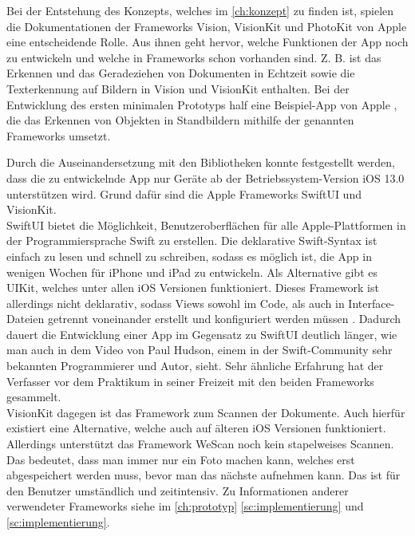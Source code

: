 \documentclass[notables, nomenclature, oneside, 150]{HSMW-Thesis}
\begin{document}
		Bei der Entstehung des Konzepts, welches im \autoref{ch:konzept} zu finden ist, spielen die Dokumentationen der Frameworks Vision, VisionKit und PhotoKit von Apple eine entscheidende Rolle. Aus ihnen geht hervor, welche Funktionen der App noch zu entwickeln und welche in Frameworks schon vorhanden sind. Z. B. ist das Erkennen und das Geradeziehen von Dokumenten in Echtzeit sowie die Texterkennung auf Bildern in Vision und VisionKit enthalten. Bei der Entwicklung des ersten minimalen Prototyps half eine Beispiel-App von Apple \cite{apple_detecting_2019}, die das Erkennen von Objekten in Standbildern mithilfe der genannten Frameworks umsetzt.
		
		Durch die Auseinandersetzung mit den Bibliotheken konnte festgestellt werden, dass die zu entwickelnde App nur Geräte ab der Betriebssystem-Version iOS 13.0 unterstützen wird. Grund dafür sind die Apple Frameworks SwiftUI und VisionKit. \\
		SwiftUI bietet die Möglichkeit, Benutzeroberflächen für alle Apple-Plattformen in der Programmiersprache Swift zu erstellen. Die deklarative Swift-Syntax ist einfach zu lesen und schnell zu schreiben, sodass es möglich ist, die App in wenigen Wochen für iPhone und iPad zu entwickeln. Als Alternative gibt es UIKit, welches unter allen iOS Versionen funktioniert. Dieses Framework ist allerdings nicht deklarativ, sodass Views sowohl im Code, als auch in Interface-Dateien getrennt voneinander erstellt und konfiguriert werden müssen \cite{sillmann_einstieg_2019}. Dadurch dauert die Entwicklung einer App im Gegensatz zu SwiftUI deutlich länger, wie man auch in dem Video von Paul Hudson, einem in der Swift-Community sehr bekannten Programmierer und Autor, sieht. Sehr ähnliche Erfahrung hat der Verfasser vor dem Praktikum in seiner Freizeit mit den beiden Frameworks gesammelt. \\
		VisionKit dagegen ist das Framework zum Scannen der Dokumente. Auch hierfür existiert eine Alternative, welche auch auf älteren iOS Versionen funktioniert. Allerdings unterstützt das Framework WeScan noch kein stapelweises Scannen. Das bedeutet, dass man immer nur ein Foto machen kann, welches erst abgespeichert werden muss, bevor man das nächste aufnehmen kann. Das ist für den Benutzer umständlich und zeitintensiv. Zu Informationen anderer verwendeter Frameworks siehe im \autoref{ch:prototyp} \autoref{sc:implementierung} und \autoref{sc:implementierung}.
\end{document}
